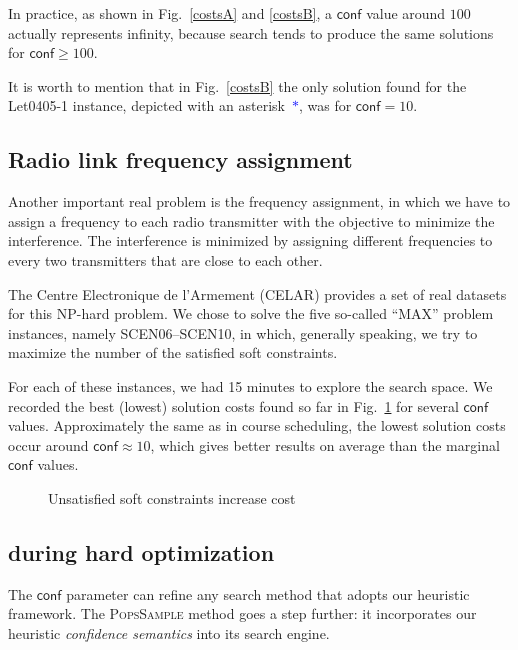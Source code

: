 \documentclass{ws-ijait}
\begin{document}
In practice, as shown in Fig.\ \ref{costsA} and \ref{costsB}, a $\mathsf{conf}$ value around $100$ actually represents infinity, because search tends to produce the same solutions for $\mathsf{conf} \geq 100$.

It is worth to mention that in Fig.~\ref{costsB} the only solution found for the \textsf{Let0405-1} instance, depicted with an asterisk~\textcolor{blue}{$*$}, was for $\mathsf{conf} = 10$.

\subsection{Radio link frequency assignment}

Another important real problem is the frequency assignment, in which we have to assign a frequency to each radio transmitter with the objective to minimize the interference. The interference is minimized by assigning different frequencies to every two transmitters that are close to each other.

The Centre Electronique de l'Armement (CELAR) provides a set of real datasets for this NP-hard problem.\cite{radio-link} We chose to solve the five so-called ``MAX'' problem instances, namely \textsf{SCEN06}--\textsf{SCEN10}, in which, generally speaking, we try to maximize the number of the satisfied soft constraints.

For each of these instances, we had 15 minutes to explore the search space. We recorded the best (lowest) solution costs found so far in Fig.~\ref{CELAR} for several $\mathsf{conf}$ values. Approximately the same as in course scheduling, the lowest solution costs occur around $\mathsf{conf} \approx 10$, which gives better results on average than the marginal $\mathsf{conf}$ values.

\begin{figure}
  \centering
  
  \caption{Unsatisfied soft constraints increase cost\label{CELAR}}
\end{figure}

\subsection{\PopsSample{} during hard optimization\label{PoPS}}

The $\mathsf{conf}$ parameter can refine any search method that adopts our heuristic framework. The \textsc{PopsSample} method goes a step further: it incorporates our heuristic \emph{confidence semantics} into its search engine.
\end{document}
